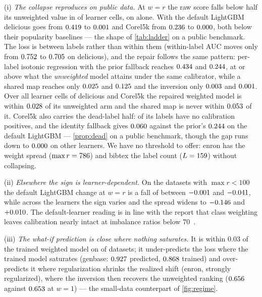 \documentclass[sigconf,nonacm]{acmart}
\begin{document}
(i) \emph{The collapse reproduces on public data.} At $w{=}r$ the raw score falls below half its unweighted value in \nnCollapseCells{} of \nnDoseCells{} learner cells, on \ncollapseDatasets{} alone. With the default LightGBM delicious goes from $0.419$ to $0.001$ and Corel5k from $0.236$ to $0.000$, both below their popularity baselines --- the shape of \cref{tab:ladder} on a public benchmark. The loss is between labels rather than within them (within-label AUC moves only from $0.752$ to $0.705$ on delicious), and the repair follows the same pattern: per-label isotonic regression with the prior fallback reaches $0.434$ and $0.244$, at or above what the \emph{unweighted} model attains under the same calibrator, while a shared map reaches only $0.025$ and $0.125$ and the inversion only $0.003$ and $0.001$. Over all \nnRepairCollapseCells{} learner cells of delicious and Corel5k the repaired weighted model is within $0.028$ of its unweighted arm and the shared map is never within $0.053$ of it. Corel5k also carries the dead-label half: \ncorelDeadCalDose{} of its \ncorelL{} labels have no calibration positives, and the identity fallback gives $0.060$ against the prior's $0.244$ on the default LightGBM --- \cref{prop:dead} on a public benchmark, though the gap runs down to $0.000$ on other learners. We have no threshold to offer: enron has the weight spread ($\max r=786$) and bibtex the label count ($L=159$) without collapsing.

(ii) \emph{Elsewhere the sign is learner-dependent.} On the \nnMulanModest{} datasets with $\max r<100$ the default LightGBM change at $w{=}r$ is a fall of between $-0.001$ and $-0.041$, while across the \nnLearners{} learners the sign varies and the spread widens to $-0.146$ and $+0.010$. The default-learner reading is in line with the report that class weighting leaves calibration nearly intact at imbalance ratios below 70~\cite{Liu2026Resampling}.

(iii) \emph{The what-if prediction is close where nothing saturates.} It is within $0.03$ of the trained weighted model on \nnWhatifClose{} of \nnMulan{} datasets; it under-predicts the loss where the trained model saturates (genbase: $0.927$ predicted, $0.868$ trained) and over-predicts it where regularization shrinks the realized shift (enron, strongly regularized), where the inversion then recovers the unweighted ranking ($0.656$ against $0.653$ at $w{=}1$) --- the small-data counterpart of \cref{fig:regime}.
\end{document}
